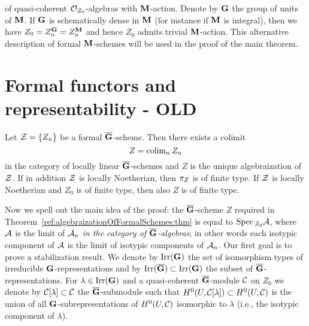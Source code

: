 \begin{center}
\end{center}
of quasi-coherent ${\mathcal O}_{Z_0}$-algebras with $\mathbf{M}$-action. Denote by $\mathbf{G}$ the group of units of $\mathbf{M}$. If $\mathbf{G}$ is schematically dense in $\mathbf{M}$ (for instance if $\mathbf{M}$ is integral), then we have $Z_0 = Z_n^{\mathbf{G}} = Z_n^{\mathbf{M}}$ and hence $Z_0$ admits trivial $\mathbf{M}$-action. This alternative description of formal $\mathbf{M}$-schemes will be used in the proof of the main theorem.

\section{Formal functors and representability - OLD}

    \begin{theorem}\label{ref:algebraizationOfFormalSchemes:thm}
        Let ${\mathcal Z} =\{Z_n\}$ be a formal $\overline{\mathbf{G}}$-scheme. Then there exists
        a colimit
        \[
            Z = \operatorname{colim}_{n} Z_n
        \]
        in the category of locally linear $\overline{\mathbf{G}}$-schemes and $Z$ is the
        unique algebraization of ${\mathcal Z}$.
        If in addition ${\mathcal Z}$ is locally Noetherian, then $\pi_{Z}$ is of finite type. If
        ${\mathcal Z}$ is locally Noetherian and $Z_0$ is of finite type, then also $Z$ is of
        finite type.
    \end{theorem}

Now we spell out the main idea of the proof: the $\overline{\mathbf{G}}$-scheme $Z$
required in Theorem~\ref{ref:algebraizationOfFormalSchemes:thm} is equal to $\mathrm{Spec}\,_{Z_0} {\mathcal A}$, where
${\mathcal A}$ is the limit of ${\mathcal A}_n$ \emph{in the category of
$\overline{\mathbf{G}}$-algebras}; in other words each isotypic component of ${\mathcal A}$ is the
limit of isotypic components of ${\mathcal A}_n$.
Our first goal is to prove a stabilization result.
We denote by $\operatorname{Irr}(\mathbf{G})$ the set of isomorphism types of irreducible
$\mathbf{G}$-representations and by $\operatorname{Irr}(\overline{\mathbf{G}}) \subset \operatorname{Irr}(\mathbf{G})$ the
subset of $\overline{\mathbf{G}}$-representations. For $\lambda\in \operatorname{Irr}(\mathbf{G})$ and
a quasi-coherent $\overline{\mathbf{G}}$-module ${\mathcal C}$ on $Z_0$ we denote by ${\mathcal C}[\lambda]
\subset {\mathcal C}$ the $\overline{\mathbf{G}}$-submodule such that $H^0(U, {\mathcal C}[\lambda]) \subset H^0(U, {\mathcal C})$
is the union of all $\mathbf{G}$-subrepresentations of $H^0(U, {\mathcal C})$ isomorphic to
$\lambda$ (i.e., the isotypic component of $\lambda$).


